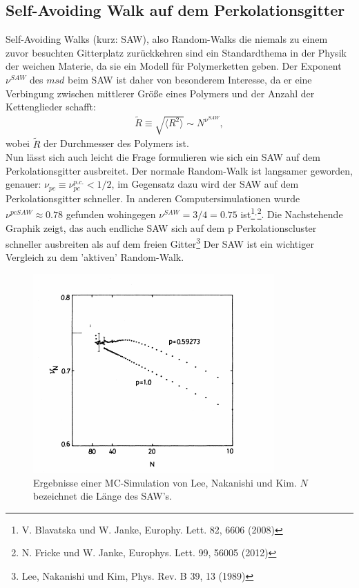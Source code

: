\documentclass[a4paper, 12pt]{scrartcl}
\begin{document}
\newpage


\subsection{Self-Avoiding Walk auf dem Perkolationsgitter}
Self-Avoiding Walks (kurz: SAW), also Random-Walks die niemals zu einem zuvor besuchten Gitterplatz zurückkehren sind ein Standardthema in der Physik der weichen Materie, da sie ein Modell für Polymerketten geben. Der Exponent $\nu^{SAW}$ des $msd$ beim SAW ist daher von besonderem Interesse, da er eine Verbingung zwischen mittlerer Größe eines Polymers und der Anzahl der Kettenglieder schafft:
\begin{align*}
\tilde R \equiv \sqrt{\langle R^2 \rangle} \sim N^{\nu^{SAW}},
\end{align*} 
wobei $\tilde R$ der Durchmesser des Polymers ist.
\\
Nun lässt sich auch leicht die Frage formulieren wie sich ein SAW auf dem Perkolationsgitter ausbreitet. Der normale Random-Walk ist langsamer geworden, genauer: $\nu_{pc} \equiv \nu_{pc}^{p.c.} < 1/2$, im Gegensatz dazu wird der SAW auf dem Perkolationsgitter schneller. In anderen Computersimulationen wurde $\nu^{pcSAW} \approx 0.78$ gefunden wohingegen $\nu^{SAW}=3/4=0.75$ ist\footnote[5]{V. Blavatska und W. Janke, Europhy. Lett. 82, 6606 (2008)}$^,$\footnote[6]{N. Fricke und W. Janke, Europhys. Lett. 99, 56005 (2012)}. Die Nachstehende Graphik zeigt, das auch endliche SAW sich auf dem p
Perkolationscluster schneller ausbreiten als auf dem freien Gitter\footnote[7]{Lee, Nakanishi und Kim, Phys. Rev. B 39, 13 (1989)} Der SAW ist ein wichtiger Vergleich zu dem 'aktiven' Random-Walk.
\begin{figure}[h!]
	\centering
	\includegraphics[scale=1.2]{saw.png}
	\caption{Ergebnisse einer MC-Simulation von Lee, Nakanishi und Kim. $N$ bezeichnet die Länge des SAW's.}
\end{figure}
\end{document}
